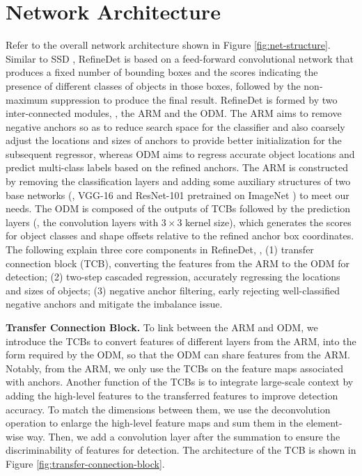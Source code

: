 \documentclass[10pt,twocolumn,letterpaper]{article}
\begin{document}
\section{Network Architecture}
Refer to the overall network architecture shown in Figure \ref{fig:net-structure}. Similar to SSD \cite{DBLP:conf/eccv/LiuAESRFB16}, RefineDet is based on a feed-forward convolutional network that produces a fixed number of bounding boxes and the scores indicating the presence of different classes of objects in those boxes, followed by the non-maximum suppression to produce the final result. RefineDet is formed by two inter-connected modules, \ie, the ARM and the ODM. The ARM aims to remove negative anchors so as to reduce search space for the classifier and also coarsely adjust the locations and sizes of anchors to provide better initialization for the subsequent regressor, whereas ODM aims to regress accurate object locations and predict multi-class labels based on the refined anchors. The ARM is constructed by removing the classification layers and adding some auxiliary structures of two base networks (\ie, VGG-16 \cite{DBLP:journals/corr/SimonyanZ14a} and ResNet-101 \cite{DBLP:conf/cvpr/HeZRS16} pretrained on ImageNet \cite{DBLP:journals/ijcv/RussakovskyDSKS15}) to meet our needs. The ODM is composed of the outputs of TCBs followed by the prediction layers (\ie, the convolution layers with $3\times3$ kernel size), which generates the scores for object classes and shape offsets relative to the refined anchor box coordinates. The following explain three core components in RefineDet, \ie, (1) transfer connection block (TCB), converting the features from the ARM to the ODM for detection; (2) two-step cascaded regression, accurately regressing the locations and sizes of objects; (3) negative anchor filtering, early rejecting well-classified negative anchors and mitigate the imbalance issue.





{\noindent \textbf{Transfer Connection Block.}}
To link between the ARM and ODM, we introduce  the TCBs to convert features of different layers from the ARM, into the form required by the ODM, so that the ODM can share features from the ARM. Notably, from the ARM, we only use the TCBs on the feature maps associated with anchors. Another function of the TCBs is to integrate large-scale context \cite{DBLP:journals/corr/FuLRTB17,DBLP:conf/cvpr/LinDGHHB17} by adding the high-level features to the transferred features to improve detection accuracy. To match the dimensions between them, we use the deconvolution operation to enlarge the high-level feature maps and sum them in the element-wise way. Then, we add a convolution layer after the summation to ensure the discriminability of features for detection. The architecture of the TCB is shown in Figure \ref{fig:transfer-connection-block}.
\end{document}
